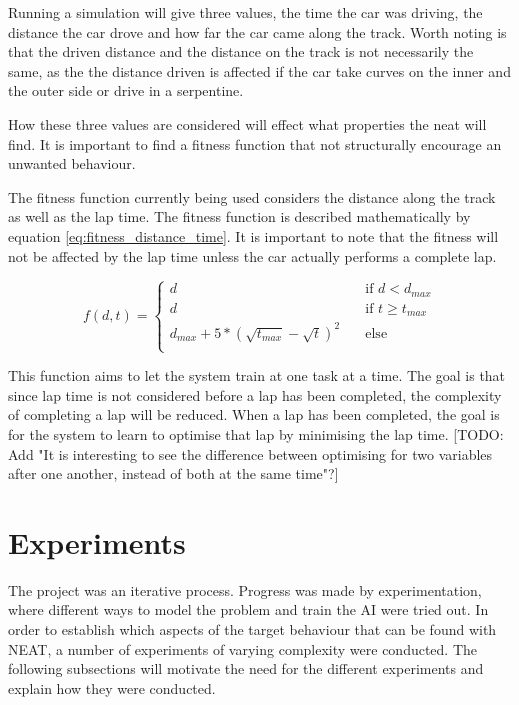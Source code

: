 Running a simulation will give three values, the time the car was driving, the distance the car drove and how far the car came along the track. Worth noting is that the driven distance and the distance on the track is not necessarily the same, as the the distance driven is affected if the car take curves on the inner and the outer side or drive in a serpentine.

How these three values are considered will effect what properties the neat will find. It is important to find a fitness function that not structurally encourage an unwanted behaviour.

The fitness function currently being used considers the distance along the track as well as the lap time. The fitness function is described mathematically by equation \ref{eq:fitness_distance_time}. It is important to note that the fitness will not be affected by the lap time unless the car actually performs a complete lap.

\begin{equation}
\label{eq:fitness_distance_time}
  f(d, t) =
  \begin{cases}
    d    & \quad \text{if } d < d_{max} \\
    d    & \quad \text{if } t \geq t_{max} \\
    d_{max} + 5*(\sqrt{t_{max}} - \sqrt{t})^2    &\quad \text{else} \\
  \end{cases}
\end{equation}

\noindent
This function aims to let the system train at one task at a time. The goal is that since lap time is not considered before a lap has been completed, the complexity of completing a lap will be reduced. When a lap has been completed, the goal is for the system to learn to optimise that lap by minimising the lap time. [TODO: Add "It is interesting to see the difference between optimising for two variables after one another, instead of both at the same time"?]






\section{Experiments}

The project was an iterative process. Progress was made by experimentation, where different ways to model the problem and train the AI were tried out. In order to establish which aspects of the target behaviour that can be found with NEAT, a number of experiments of varying complexity were conducted. The following subsections will motivate the need for the different experiments and explain how they were conducted. 

